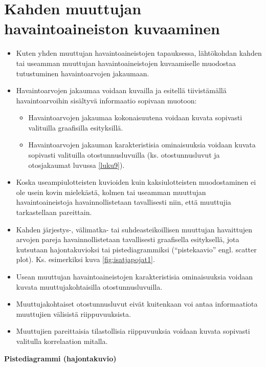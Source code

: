 \documentclass[
]{book}
\providecommand{\tightlist}{%
  \setlength{\itemsep}{0pt}\setlength{\parskip}{0pt}}
\begin{document}
\hypertarget{alaluku62}{%
\section{Kahden muuttujan havaintoaineiston kuvaaminen}\label{alaluku62}}

\begin{itemize}
\item
  Kuten yhden muuttujan havaintoaineistojen tapauksessa, lähtökohdan kahden tai useamman muuttujan havaintoaineistojen kuvaamiselle muodostaa tutustuminen havaintoarvojen jakaumaan.
\item
  Havaintoarvojen jakaumaa voidaan kuvailla ja esitellä tiivistämällä havaintoarvoihin sisältyvä informaatio sopivaan muotoon:

  \begin{itemize}
  \tightlist
  \item
    Havaintoarvojen jakaumaa kokonaisuutena voidaan kuvata sopivasti valituilla graafisilla esityksillä.
  \item
    Havaintoarvojen jakauman karakteristisia ominaisuuksia voidaan kuvata sopivasti valituilla otostunnusluvuilla (ks. otostunnusluvut ja otosjakaumat luvussa \ref{luku9}).
  \end{itemize}
\item
  Koska useampiulotteisten kuvioiden kuin kaksiulotteisten muodostaminen ei ole usein kovin mielekästä, kolmen tai useamman muuttujan havaintoaineistoja havainnollistetaan tavallisesti niin, että muuttujia tarkastellaan pareittain.
\item
  Kahden järjestys-, välimatka- tai suhdeasteikoillisen muuttujan havaittujen arvojen pareja havainnollistetaan tavallisesti graafisella esityksellä, jota kutsutaan hajontakuvioksi tai pistediagrammiksi (``pistekaavio'' engl. scatter plot). Ks. esimerkiksi kuva \ref{fig:isatjapojat1}.
\item
  Usean muuttujan havaintoaineistojen karakteristisia ominaisuuksia voidaan kuvata muuttujakohtaisilla otostunnusluvuilla.
\item
  Muuttujakohtaiset otostunnusluvut eivät kuitenkaan voi antaa informaatiota muuttujien välisistä riippuvuuksista.
\item
  Muuttujien pareittaisia tilastollisia riippuvuuksia voidaan kuvata sopivasti valitulla korrelaation mitalla.
\end{itemize}

\hfill\break

\textbf{Pistediagrammi (hajontakuvio)}
\end{document}
